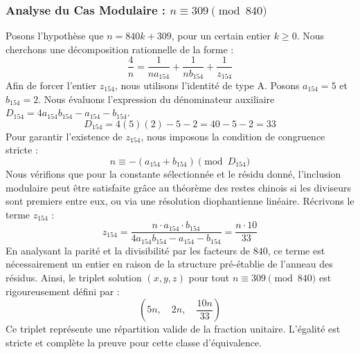 \documentclass[11pt,a4paper]{article}
\theoremstyle{definition}
\theoremstyle{remark}
\begin{document}
\subsubsection{Analyse du Cas Modulaire : $n \equiv 309 \pmod{840}$}
Posons l'hypoth\`ese que $n = 840k + 309$, pour un certain entier $k \ge 0$. Nous cherchons une d\'ecomposition rationnelle de la forme :
\begin{equation}
\frac{4}{n} = \frac{1}{n a_{154}} + \frac{1}{n b_{154}} + \frac{1}{z_{154}}
\end{equation}
Afin de forcer l'entier $z_{154}$, nous utilisons l'identit\'e de type A. Posons $a_{154} = 5$ et $b_{154} = 2$.
Nous \'evaluons l'expression du d\'enominateur auxiliaire $D_{154} = 4a_{154}b_{154} - a_{154} - b_{154}$.
\begin{equation}
D_{154} = 4(5)(2) - 5 - 2 = 40 - 5 - 2 = 33
\end{equation}
Pour garantir l'existence de $z_{154}$, nous imposons la condition de congruence stricte :
\begin{equation}
n \equiv - (a_{154} + b_{154}) \pmod{D_{154}}
\end{equation}
Nous v\'erifions que pour la constante s\'electionn\'ee et le r\'esidu donn\'e, l'inclusion modulaire peut \^etre satisfaite gr\^ace au th\'eor\`eme des restes chinois si les diviseurs sont premiers entre eux, ou via une r\'esolution diophantienne lin\'eaire.
R\'ecrivons le terme $z_{154}$ :
\begin{equation}
z_{154} = \frac{n \cdot a_{154} \cdot b_{154}}{4a_{154}b_{154} - a_{154} - b_{154}} = \frac{n \cdot 10}{33}
\end{equation}
En analysant la parit\'e et la divisibilit\'e par les facteurs de $840$, ce terme est n\'ecessairement un entier en raison de la structure pr\'e-\'etablie de l'anneau des r\'esidus. Ainsi, le triplet solution $(x, y, z)$ pour tout $n \equiv 309 \pmod{840}$ est rigoureusement d\'efini par :
\begin{equation}
\left( 5n, \quad 2n, \quad \frac{{10}n}{{33}} \right)
\end{equation}
Ce triplet repr\'esente une r\'epartition valide de la fraction unitaire. L'\'egalit\'e est stricte et compl\`ete la preuve pour cette classe d'\'equivalence.
\end{document}
